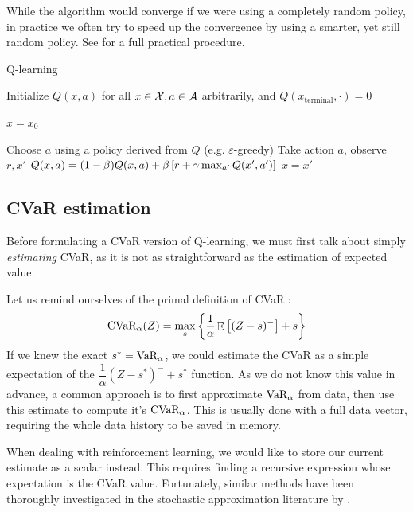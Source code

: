 While the algorithm would converge if we were using a completely random policy, in practice we often try to speed up the convergence by using a smarter, yet still random policy. See  for a full practical procedure.


\begin{algorithm}
\caption{Q-learning}
\begin{algorithmic}\label{alg:qlearning}
    \STATE Initialize $Q(x, a)$ for all $x \in \mathcal{X}, a \in \mathcal{A}$ arbitrarily, and $Q(x_\text{terminal}, \cdot) = 0$
    
		
	\STATE $x = x_0$
	
	\STATE Choose $a$ using a policy derived from $Q$ (e.g. $\varepsilon$-greedy)
	\STATE Take action $a$, observe $r, x'$
	\STATE $Q(x, a) = (1-\beta)Q(x, a) + \beta\left[ {r + \gamma \max_{a'} Q(x', a')} \right]$
	\STATE $x = x'$	
	\ENDWHILE
	
	\ENDFOR
\end{algorithmic}
\end{algorithm}


\subsection{CVaR estimation}\label{sec:cvarestimation}

Before formulating a CVaR version of Q-learning, we must first talk about simply \emph{estimating} CVaR, as it is not as straightforward as the estimation of expected value.

Let us remind ourselves of the primal definition of CVaR :
\begin{equation*}
\text{CVaR}_\alpha(Z)=
\max_s\left\lbrace \dfrac{1}{\alpha}\mathop{\mathbb{E}}
\left[ (Z-s)^-\right] + s  \right\rbrace 
\end{equation*}
If we knew the exact $s^*=\text{VaR}_\alpha$, we could estimate the CVaR as a simple expectation of the $\dfrac{1}{\alpha}(Z-s^*)^-+s^*$ function. As we do not know this value in advance, a common approach is to first approximate $\text{VaR}_\alpha$ from data, then use this estimate to compute it's $\text{CVaR}_\alpha$. This is usually done with a full data vector, requiring the whole data history to be saved in memory.

When dealing with reinforcement learning, we would like to store our current estimate as a scalar instead. This requires finding a recursive expression whose expectation is the CVaR value. Fortunately, similar methods have been thoroughly investigated in the stochastic approximation literature by \citet{robbins1951stochastic}.

